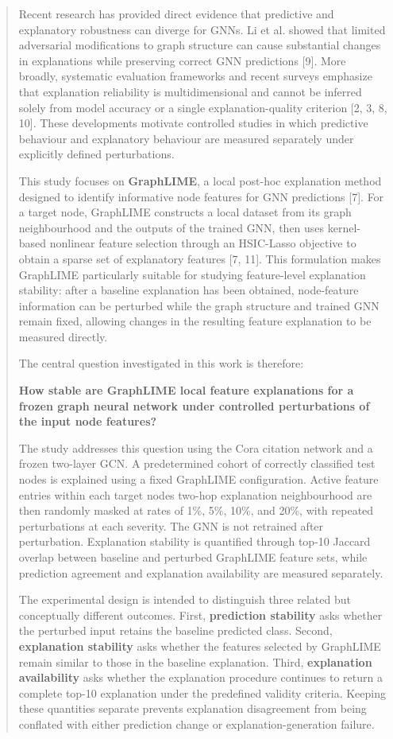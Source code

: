 \documentclass[a4paper]{article}
\begin{document}
\begin{quote}
Recent research has provided direct evidence that predictive and
explanatory robustness can diverge for GNNs. Li et al. showed that
limited adversarial modifications to graph structure can cause
substantial changes in explanations while preserving correct GNN
predictions {[}9{]}. More broadly, systematic evaluation frameworks and
recent surveys emphasize that explanation reliability is
multidimensional and cannot be inferred solely from model accuracy or a
single explanation-quality criterion {[}2, 3, 8, 10{]}. These
developments motivate controlled studies in which predictive behaviour
and explanatory behaviour are measured separately under explicitly
defined perturbations.

This study focuses on \textbf{GraphLIME}, a local post-hoc explanation
method designed to identify informative node features for GNN
predictions {[}7{]}. For a target node, GraphLIME constructs a local
dataset from its graph neighbourhood and the outputs of the trained GNN,
then uses kernel-based nonlinear feature selection through an HSIC-Lasso
objective to obtain a sparse set of explanatory features {[}7, 11{]}.
This formulation makes GraphLIME particularly suitable for studying
feature-level explanation stability: after a baseline explanation has
been obtained, node-feature information can be perturbed while the graph
structure and trained GNN remain fixed, allowing changes in the
resulting feature explanation to be measured directly.

The central question investigated in this work is therefore:

\textbf{How stable are GraphLIME local feature explanations for a frozen
graph neural network under controlled perturbations of the input node
features?}

The study addresses this question using the Cora citation network and a
frozen two-layer GCN. A predetermined cohort of correctly classified
test nodes is explained using a fixed GraphLIME configuration. Active
feature entries within each target node\textquotesingle s two-hop
explanation neighbourhood are then randomly masked at rates of 1\%, 5\%,
10\%, and 20\%, with repeated perturbations at each severity. The GNN is
not retrained after perturbation. Explanation stability is quantified
through top-10 Jaccard overlap between baseline and perturbed GraphLIME
feature sets, while prediction agreement and explanation availability
are measured separately.

The experimental design is intended to distinguish three related but
conceptually different outcomes. First, \textbf{prediction stability}
asks whether the perturbed input retains the baseline predicted class.
Second, \textbf{explanation stability} asks whether the features
selected by GraphLIME remain similar to those in the baseline
explanation. Third, \textbf{explanation availability} asks whether the
explanation procedure continues to return a complete top-10 explanation
under the predefined validity criteria. Keeping these quantities
separate prevents explanation disagreement from being conflated with
either prediction change or explanation-generation failure.


\end{quote}
\end{document}
